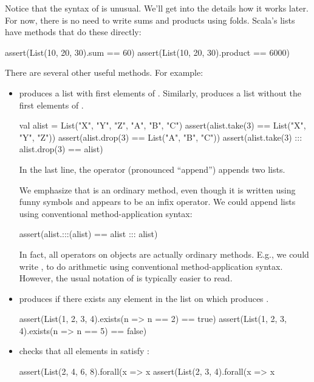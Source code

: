 \documentclass[9pt]{extbook}
\begin{document}
Notice that the syntax of  is unusual. We'll get into the
details how it works later. For now, there is no need to write sums and products
using folds. Scala's lists have methods that do these directly:

\begin{scalacode}
assert(List(10, 20, 30).sum == 60)
assert(List(10, 20, 30).product == 6000)
\end{scalacode}

There are several other useful methods. For example:

\begin{itemize}

  \item {} produces a list with first 
  elements of . Similarly,  produces
  a list without the first  elements of .
  \begin{scalacode}
  val alist = List("X", "Y", "Z", "A", "B", "C")
  assert(alist.take(3) == List("X", "Y", "Z"))
  assert(alist.drop(3) == List("A", "B", "C"))
  assert(alist.take(3) ::: alist.drop(3) == alist)
  \end{scalacode}

  In the last line, the \scalainline{:::} operator (pronounced ``append'')
  appends two lists.

  \begin{notation}
  We emphasize that \scalainline{:::} is an ordinary method,
  even though it is written using funny symbols and appears to be an infix
  operator. We could append lists using conventional method-application
  syntax:
  \begin{scalacode}
  assert(alist.:::(alist) == alist ::: alist)
  \end{scalacode}
  In fact, all operators on objects are actually ordinary methods. E.g.,
  we could write , to do arithmetic using
  conventional method-application syntax. However, the usual notation
  of  is typically easier to read.

  \end{notation}

  \item {} produces  if there
  exists any element in the list on which  produces
  .

  \begin{scalacode}
  assert(List(1, 2, 3, 4).exists(n => n == 2) == true)
  assert(List(1, 2, 3, 4).exists(n => n == 5) == false)
  \end{scalacode}

  \item {} checks that all elements in 
  satisfy :
  \begin{scalacode}
  assert(List(2, 4, 6, 8).forall(x => x %
  assert(List(2, 3, 4).forall(x => x %
  \end{scalacode}

\end{itemize}
\end{document}
